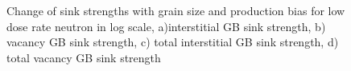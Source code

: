 \documentclass[a4paper]{article}
\begin{document}
\begin{figure}[h!]
        \qquad
        \caption{Change of sink strengths with grain size and production bias for low dose rate neutron in log scale, a)interstitial GB sink strength, b) vacancy GB sink strength, c) total interstitial GB sink strength, d) total vacancy GB sink strength}
        \label{figure:sink_strength_moose_neutron_3D}
      \end{figure}
  \newpage
\end{document}
